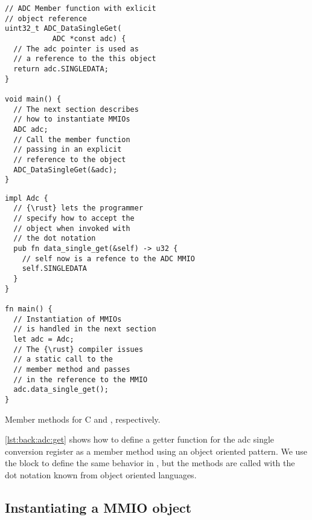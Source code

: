 \begin{listing}[H]
  \centering
  \begin{minipage}{0.47\textwidth}
  \begin{listing}
      \begin{verbatim}
// ADC Member function with exlicit
// object reference
uint32_t ADC_DataSingleGet(
           ADC *const adc) {
  // The adc pointer is used as
  // a reference to the this object
  return adc.SINGLEDATA;
}

void main() {
  // The next section describes
  // how to instantiate MMIOs
  ADC adc;
  // Call the member function
  // passing in an explicit
  // reference to the object
  ADC_DataSingleGet(&adc);
}
      \end{verbatim}
  \end{listing}
  \end{minipage}
  \hfill
  \begin{minipage}{0.47\textwidth}
  \begin{listing}
      \begin{verbatim}
impl Adc {
  // {\rust} lets the programmer
  // specify how to accept the
  // object when invoked with
  // the dot notation
  pub fn data_single_get(&self) -> u32 {
    // self now is a refence to the ADC MMIO
    self.SINGLEDATA
  }
}

fn main() {
  // Instantiation of MMIOs
  // is handled in the next section
  let adc = Adc;
  // The {\rust} compiler issues
  // a static call to the
  // member method and passes
  // in the reference to the MMIO
  adc.data_single_get();
}
      \end{verbatim}
  \end{listing}
  \end{minipage}
  \caption{Member methods for C and {\rust}, respectively.}
  \label{lst:back:adc:get}

\end{listing}

\autoref{lst:back:adc:get} shows how to define a getter function for the \gls{adc} single conversion register as a member method using an object oriented pattern.
We use the  block to define the same behavior in {\rust}, but the methods are called with the dot notation known from object oriented languages.

\subsection{Instantiating a MMIO object}

